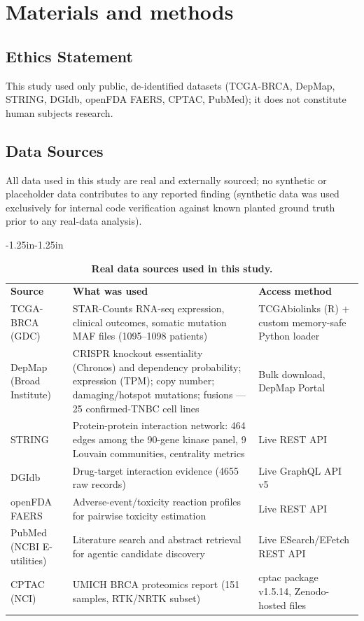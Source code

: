 \documentclass[10pt,letterpaper]{article}
\newlength\savedwidth
\newcommand\thickhline{\noalign{\global\savedwidth\arrayrulewidth\global\arrayrulewidth 2pt}%
\hline
\noalign{\global\arrayrulewidth\savedwidth}}
\begin{document}
\section*{Materials and methods}

\subsection*{Ethics Statement}
This study used only public, de-identified datasets (TCGA-BRCA, DepMap, STRING, DGIdb, openFDA FAERS, CPTAC, PubMed); it does not constitute human subjects research.

\subsection*{Data Sources}
All data used in this study are real and externally sourced; no synthetic or placeholder data contributes to any reported finding (synthetic data was used exclusively for internal code verification against known planted ground truth prior to any real-data analysis).

\begin{adjustwidth}{-1.25in}{-1.25in}
\begin{table}[!ht]
\centering
\caption{\textbf{Real data sources used in this study.}}
\begin{tabular}{|p{1.3in}|p{2.7in}|p{1.3in}|}
\hline
\textbf{Source} & \textbf{What was used} & \textbf{Access method} \\ \thickhline
TCGA-BRCA (GDC) & STAR-Counts RNA-seq expression, clinical outcomes, somatic mutation MAF files (1095--1098 patients) & TCGAbiolinks (R) + custom memory-safe Python loader \\ \hline
DepMap (Broad Institute) & CRISPR knockout essentiality (Chronos) and dependency probability; expression (TPM); copy number; damaging/hotspot mutations; fusions --- 25 confirmed-TNBC cell lines & Bulk download, DepMap Portal \\ \hline
STRING & Protein-protein interaction network: 464 edges among the 90-gene kinase panel, 9 Louvain communities, centrality metrics & Live REST API \\ \hline
DGIdb & Drug-target interaction evidence (4655 raw records) & Live GraphQL API v5 \\ \hline
openFDA FAERS & Adverse-event/toxicity reaction profiles for pairwise toxicity estimation & Live REST API \\ \hline
PubMed (NCBI E-utilities) & Literature search and abstract retrieval for agentic candidate discovery & Live ESearch/EFetch REST API \\ \hline
CPTAC (NCI) & UMICH BRCA proteomics report (151 samples, RTK/NRTK subset) & cptac package v1.5.14, Zenodo-hosted files \\ \hline
\end{tabular}
\end{table}
\end{adjustwidth}
\end{document}
